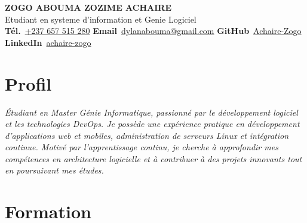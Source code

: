 \documentclass[12pt, a4paper]{article}
\begin{document}

\vspace{0.1cm}
\begin{center}
  {\fontsize{22}{28}\selectfont\bfseries\color{white}%
    ZOGO ABOUMA ZOZIME ACHAIRE}\\[5pt]
  {\large\color{accent!80!white}%
    Etudiant en systeme d'information et Genie Logiciel}\\[8pt]
  {\small\color{white}%
    \textbf{T\'el.}~\href{tel:+237657515280}{+237 657 515 280}\quad
    \textbf{Email}~\href{mailto:dylanabouma@gmail.com}{dylanabouma@gmail.com}\quad
    \textbf{GitHub}~\href{https://github.com/Achaire-Zogo}{Achaire-Zogo}\quad
    \textbf{LinkedIn}~\href{https://www.linkedin.com/in/achaire-zogo-b3b2331a9/}{achaire-zogo}%
  }
\end{center}
\vspace{0.5cm}

\section{Profil}

\textit{\'Etudiant en Master G\'enie Informatique, passionn\'e par le d\'eveloppement logiciel
et les technologies DevOps. Je poss\`ede une exp\'erience pratique en d\'eveloppement d'applications
web et mobiles, administration de serveurs Linux et int\'egration continue. Motiv\'e par l'apprentissage
continu, je cherche \`a approfondir mes comp\'etences en architecture logicielle et \`a contribuer
\`a des projets innovants tout en poursuivant mes \'etudes.}

\section{Formation}
\end{document}
